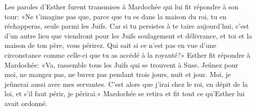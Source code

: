 Les paroles d’Esther furent transmises à Mardochée qui lui fit répondre à son tour:
	«Ne t’imagine pas que, parce que tu es dans la maison du roi,
	tu en réchapperas, seule parmi les Juifs.
Car si tu persistes à te taire aujourd’hui,
	c’est d’un autre lieu que viendront pour les Juifs soulagement et délivrance,
	et toi et la maison de ton père, vous périrez.
Qui sait si ce n’est pas en vue d’une circonstance comme celle-ci
		que tu as accédé à la royauté?»
Esther fit répondre à Mardochée:
	«Va, rassemble tous les Juifs qui se trouvent à Suse.
Jeûnez pour moi, ne mangez pas, ne buvez pas pendant trois jours, nuit et jour.
	Moi, je jeûnerai aussi avec mes servantes.
C’est alors que j’irai chez le roi, en dépit de la loi,
	et s’il faut périr, je périrai.»
Mardochée se retira et fit tout ce qu’Esther lui avait ordonné.
